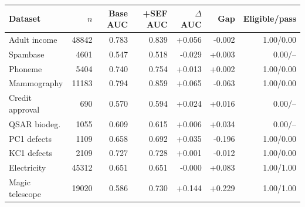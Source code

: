 \begin{tabular}{lrrrrrr}
\toprule
Dataset & $n$ & Base AUC & +SEF AUC & $\Delta$AUC & Gap & Eligible/pass \\
\midrule
Adult income & 48842 & 0.783 & 0.839 & +0.056 & -0.002 & 1.00/0.00 \\
Spambase & 4601 & 0.547 & 0.518 & -0.029 & +0.003 & 0.00/-- \\
Phoneme & 5404 & 0.740 & 0.754 & +0.013 & +0.002 & 1.00/0.00 \\
Mammography & 11183 & 0.794 & 0.859 & +0.065 & -0.063 & 1.00/0.00 \\
Credit approval & 690 & 0.570 & 0.594 & +0.024 & +0.016 & 0.00/-- \\
QSAR biodeg. & 1055 & 0.609 & 0.615 & +0.006 & +0.034 & 0.00/-- \\
PC1 defects & 1109 & 0.658 & 0.692 & +0.035 & -0.196 & 1.00/0.00 \\
KC1 defects & 2109 & 0.727 & 0.728 & +0.001 & -0.012 & 1.00/0.00 \\
Electricity & 45312 & 0.651 & 0.651 & -0.000 & +0.083 & 1.00/1.00 \\
Magic telescope & 19020 & 0.586 & 0.730 & +0.144 & +0.229 & 1.00/1.00 \\
\bottomrule
\end{tabular}
